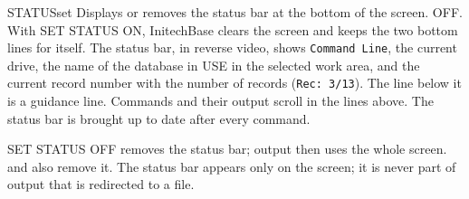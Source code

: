 \begin{XbaseEntry}{STATUS}{set}
Displays or removes the status bar at the bottom of the screen.
\Syntax
{}
\Defaults
OFF.
\Usage
With SET STATUS ON, InitechBase clears the screen and keeps the two bottom
lines for itself.  The status bar, in reverse video, shows \texttt{Command
Line}, the current drive, the name of the database in USE in the selected
work area, and the current record number with the number of records
(\texttt{Rec: 3/13}).  The line below it is a guidance line.  Commands and their
output scroll in the lines above.  The status bar is brought up to date after
every command.

SET STATUS OFF removes the status bar; output then uses the whole screen.
 and  also remove it.  The status bar appears only on the
screen; it is never part of output that is redirected to a file.
\end{XbaseEntry}

